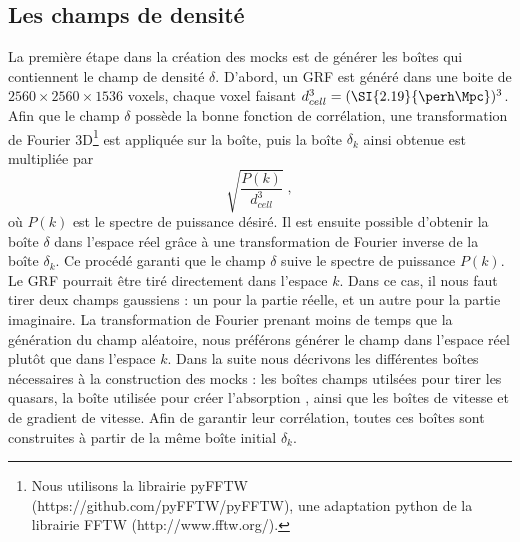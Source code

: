 \subsection{Les champs de densité}
\label{subsec:densityfields}
La première étape dans la création des mocks est de générer les boîtes qui contiennent le champ de densité $\delta$. D'abord, un GRF est généré dans une boite de $\num{2560}\times\num{2560}\times\num{1536}$ voxels, chaque voxel faisant  $d_{cell}^3 = (\SI{2.19}{\perh\Mpc})^3$.
Afin que le champ $\delta$ possède la bonne fonction de corrélation, une transformation de Fourier 3D\footnote{Nous utilisons la librairie pyFFTW (https://github.com/pyFFTW/pyFFTW), une adaptation python de la librairie FFTW (http://www.fftw.org/).} est appliquée sur la boîte, puis la boîte $\delta_k$ ainsi obtenue est multipliée par
\begin{equation}
  \sqrt{\frac{P(k)}{d_{cell}^3}} \; ,
\end{equation}
où $P(k)$ est le spectre de puissance désiré. Il est ensuite possible d'obtenir la boîte $\delta$ dans l'espace réel grâce à une transformation de Fourier inverse de la boîte $\delta_k$. Ce procédé garanti que le champ $\delta$ suive le spectre de puissance $P(k)$. 
Le GRF pourrait être tiré directement dans l'espace $k$. Dans ce cas, il nous faut tirer deux champs gaussiens : un pour la partie réelle, et un autre pour la partie imaginaire. La transformation de Fourier prenant moins de temps que la génération du champ aléatoire, nous préférons générer le champ dans l'espace réel plutôt que dans l'espace $k$.
Dans la suite nous décrivons les différentes boîtes nécessaires à la construction des mocks : les boîtes champs utilsées pour tirer les quasars, la boîte utilisée pour créer l'absorption \lya{}, ainsi que les boîtes de vitesse et de gradient de vitesse. Afin de garantir leur corrélation, toutes ces boîtes sont construites à partir de la même boîte initial $\delta_k$.


